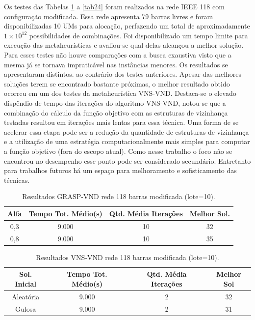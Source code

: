 \documentclass[12pt]{article}
\begin{document}
Os testes das Tabelas \ref{tab22} a \ref{tab24} foram realizados na rede IEEE 118 com configuração modificada. Essa rede apresenta 79 barras livres e foram disponibilizadas 10 UMs para alocação, perfazendo um total de aproximadamente $1 \times 10^{12}$ possibilidades de combinações. Foi disponibilizado um tempo limite para execução das metaheurísticas e avaliou-se qual delas alcançou a melhor solução. Para esses testes não houve comparações com a busca exaustiva visto que a mesma já se tornava impraticável nas instâncias menores. Os resultados se apresentaram distintos. ao contrário dos testes anteriores. Apesar das melhores soluções terem se encontrado bastante próximas, o melhor resultado obtido ocorreu em um dos testes da metaheurística VNS-VND. Destaca-se o elevado dispêndio de tempo das iterações do algoritmo VNS-VND,  notou-se que a combinação do cálculo da função objetivo com as estruturas de vizinhança testadas resultou em iterações mais lentas para essa técnica. Uma forma de se acelerar essa etapa pode ser a redução da quantidade de estruturas de vizinhança e a utilização de uma estratégia computacionalmente mais simples para computar a função objetivo (fora do escopo atual). Como nesse trabalho o foco não se encontrou no desempenho esse ponto pode ser considerado secundário. Entretanto para trabalhos futuros há um espaço para melhoramento e sofisticamento das técnicas.

\begin{table}[H]
	\centering
	\caption{Resultados GRASP-VND rede 118 barras modificada (lote=10).}
	\begin{tabular}{|c|c|c|c|}
		\hline
		\textbf{Alfa} & \textbf{Tempo Tot. Médio(s)} & \textbf{Qtd. Média Iterações} & \textbf{Melhor Sol.} \\
		\hline
		0,3   & 9.000 & 10    & 32 \\
		\hline
		0,8   & 9.000 & 10    & 35 \\
		\hline
	\end{tabular}%
	\label{tab22}%
\end{table}%

\begin{table}[H]
	\centering
	\caption{Resultados VNS-VND rede 118 barras modificada (lote=10).}
	\begin{tabular}{|c|c|c|c|}
		\hline
		\textbf{Sol. Inicial} & \textbf{Tempo Tot. Médio(s)} & \textbf{Qtd. Média Iterações} & \textbf{Melhor Sol} \\
		\hline
		Aleatória & 9.000 & 2     & 32 \\
		\hline
		Gulosa & 9.000 & 2     & 31 \\
		\hline
	\end{tabular}%
	\label{tab23}%
\end{table}%
\end{document}
